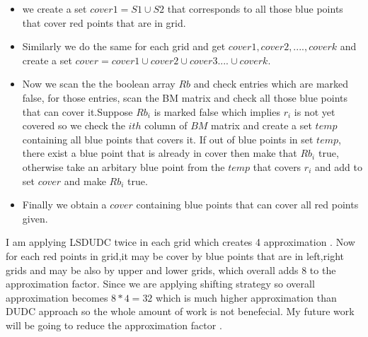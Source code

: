 \documentclass[10pt,a4wide]{report}
\theoremstyle{plain}
\theoremstyle{definition}
\theoremstyle{remark}
\begin{document}
\begin{itemize}
                             \item we create a set $cover1 = S1 \cup S2$ that corresponds to all those blue points that cover red points that are in grid.
                             \item Similarly we do the same for each grid and get $cover1,cover2,....,coverk$ and create a set $cover=cover1 \cup cover2
                                  \cup cover3 ....\cup cover k$.
                             \item Now we scan the the boolean array $Rb$ and check entries which are marked false, for those entries, scan 
                                   the BM matrix and check all those blue points that can cover it.Suppose $Rb_{i}$ is marked false which
                                   implies $r_{i}$ is not yet covered so we check the $ith$ column of $BM$ matrix and create a set $temp$
                                   containing all blue points that covers it. If out of blue points in set $temp$, there exist a blue point that is 
                                   already in cover then make that $Rb_{i}$ true, otherwise take an arbitary blue point from the $temp$ that covers 
                                   $r_{i}$ and add to set $cover$ and make $Rb_{i}$ true.
                             \item Finally we obtain a $cover$ containing blue points that can cover all red points given.
                           \end{itemize}
                            I am applying LSDUDC twice in each grid which creates 4 approximation \cite{FGRSR10}. Now for each red points in grid,it may be cover 
                            by blue points that are in left,right grids and may be also by upper and lower grids, which overall adds 8 to the approximation
                            factor. Since we are applying shifting strategy so overall approximation becomes $8\ast 4=32$ \cite{DW85} which is much higher approximation
                            than DUDC approach so the whole amount of work is not benefecial. My future work will be going to reduce the approximation factor .
                            
\end{document}
